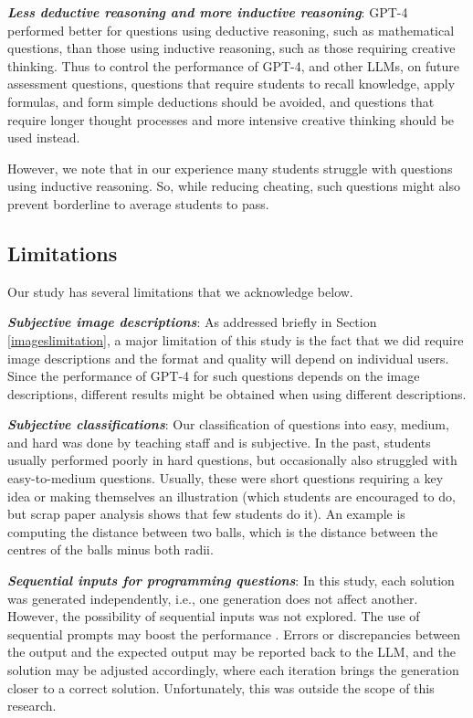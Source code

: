 \documentclass[sigconf,review]{acmart}
\begin{document}
\noindent \textit{\textbf{Less deductive reasoning and more inductive reasoning}}: GPT-4 performed better for questions using deductive reasoning, such as mathematical questions, than those using inductive reasoning, such as those requiring creative thinking. Thus to control the performance of GPT-4, and other LLMs, on future assessment questions, questions that require students to recall knowledge, apply formulas, and form simple deductions should be avoided, and questions that require longer thought processes and more intensive creative thinking should be used instead.

However, we note that in our experience many students struggle with questions using inductive reasoning. So, while reducing cheating, such questions might also prevent borderline to average students to pass.

\subsection{Limitations}

Our study has several limitations that we acknowledge below.

\noindent \textit{\textbf{Subjective image descriptions}}: As addressed briefly in Section \ref{imageslimitation}, a major limitation of this study is the fact that we did require image descriptions and the format and quality will depend on individual users. Since the performance of GPT-4 for such questions depends on the image descriptions, different results might be obtained when using different descriptions. 

\noindent \textit{\textbf{Subjective classifications}}: Our classification of questions into easy, medium, and hard was done by teaching staff and is subjective. In the past, students usually performed poorly in hard questions, but occasionally also struggled with easy-to-medium questions. Usually, these were short questions requiring a key idea or making themselves an illustration (which students are encouraged to do, but scrap paper analysis shows that few students do it). An example is computing the distance between two balls, which is the distance between the centres of the balls minus both radii.

\noindent \textit{\textbf{Sequential inputs for programming questions}}: In this study, each solution was generated independently, i.e., one generation does not affect another. However, the possibility of sequential inputs was not explored. The use of sequential prompts may boost the performance \cite{wei2023}. Errors or discrepancies between the output and the expected output may be reported back to the LLM, and the solution may be adjusted accordingly, where each iteration brings the generation closer to a correct solution. Unfortunately, this was outside the scope of this research. 
\end{document}
